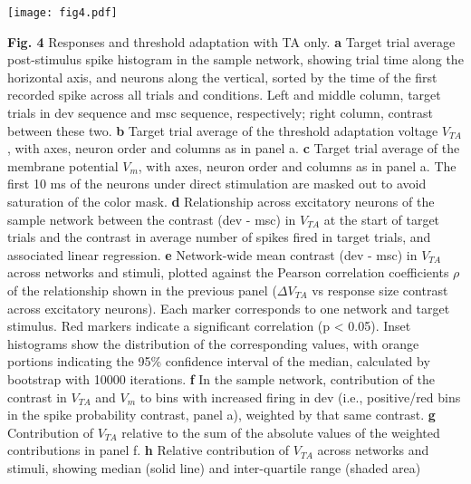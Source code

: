 \documentclass[pdflatex,referee,iicol,sn-basic]{sn-jnl}
\theoremstyle{thmstyleone}%
\theoremstyle{thmstyletwo}%
\theoremstyle{thmstylethree}%
\begin{document}
\begin{figure*}%
    \centering
    \texttt{[image: fig4.pdf]}
    \caption{}
    \label{fig4}
\end{figure*}
\textbf{Fig. 4} Responses and threshold adaptation with TA only.
\textbf{a} Target trial average post-stimulus spike histogram in the sample network, showing trial time along the horizontal axis, and neurons along the vertical, sorted by the time of the first recorded spike across all trials and conditions. Left and middle column, target trials in dev sequence and msc sequence, respectively; right column, contrast between these two.
\textbf{b} Target trial average of the threshold adaptation voltage $V_{TA}$, with axes, neuron order and columns as in panel a.
\textbf{c} Target trial average of the membrane potential $V_m$, with axes, neuron order and columns as in panel a. The first 10 ms of the neurons under direct stimulation are masked out to avoid saturation of the color mask.
\textbf{d} Relationship across excitatory neurons of the sample network between the contrast (dev - msc) in $V_{TA}$ at the start of target trials and the contrast in average number of spikes fired in target trials, and associated linear regression.
\textbf{e} Network-wide mean contrast (dev - msc) in $V_{TA}$ across networks and stimuli, plotted against the Pearson correlation coefficients $\rho$ of the relationship shown in the previous panel ($\Delta V_{TA}$ vs response size contrast across excitatory neurons). Each marker corresponds to one network and target stimulus. Red markers indicate a significant correlation (p < 0.05). Inset histograms show the distribution of the corresponding values, with orange portions indicating the 95\% confidence interval of the median, calculated by bootstrap with 10000 iterations.
\textbf{f} In the sample network, contribution of the contrast in $V_{TA}$ and $V_m$ to bins with increased firing in dev (i.e., positive/red bins in the spike probability contrast, panel a), weighted by that same contrast.
\textbf{g} Contribution of $V_{TA}$ relative to the sum of the absolute values of the weighted contributions in panel f.
\textbf{h} Relative contribution of $V_{TA}$ across networks and stimuli, showing median (solid line) and inter-quartile range (shaded area)
\end{document}
